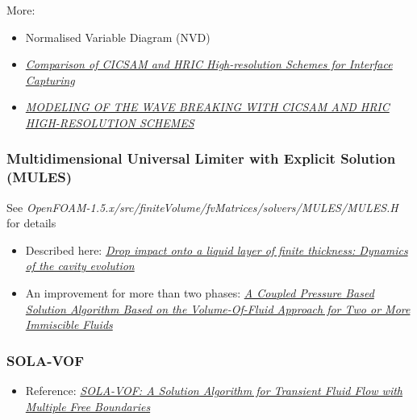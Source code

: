 More:
\begin{itemize}
    \item Normalised Variable Diagram (NVD)
    \item \textit{\href{http://warminski.pollub.plwww.ptmts.org.pl/Waclaw-Koron-2-08.pdf}{Comparison of CICSAM and HRIC High-resolution Schemes for Interface Capturing}}
    \item \textit{\href{http://proceedings.fyper.com/eccomascfd2006/documents/85.pdf}{MODELING OF THE WAVE BREAKING WITH CICSAM AND HRIC HIGH-RESOLUTION SCHEMES}}
\end{itemize}

\subsubsection{Multidimensional Universal Limiter with Explicit Solution (MULES)}

See \textit{OpenFOAM-1.5.x/src/finiteVolume/fvMatrices/solvers/MULES/MULES.H} for details


\begin{itemize}
    \item Described here: \textit{\href{http://link.libris.kb.se/sfxliub?sid=?url_ver=Z39.88-2004&rfr_id=info:sid/bibl.liu.se\%3Axerxes+\%28+PubMed+LiU\%29&rft.genre=article&rft_val_fmt=info\%3Aofi\%2Ffmt\%3Akev\%3Amtx\%3Ajournal&rft.issn=15393755&rft.date=2009&rft.jtitle=Phys+Rev+E+Stat+Nonlin+Soft+Matter+Phys&rft.volume=79&rft.issue=3+Pt+2&rft.spage=036306&rft.atitle=Drop+impact+onto+a+liquid+layer+of+finite+thickness+\%3A+dynamics+of+the+cavity+evolution+&rft.aulast=Berberovi\%C4\%87&rft.aufirst=Edin}{Drop impact onto a liquid layer of finite thickness: Dynamics of the cavity evolution}}
    \item An improvement for more than two phases: \textit{\href{http://www.mathematik.uni-ulm.de/numerik/staff/urban/reports/ECCOMASCFD2010paperfinal.pdf}{A Coupled Pressure Based Solution Algorithm Based on the Volume-Of-Fluid Approach for Two or More Immiscible Fluids}}
\end{itemize}

\subsubsection{SOLA-VOF}

\begin{itemize}
    \item Reference: \textit{\href{http://www.ewp.rpi.edu/hartford/~ernesto/Su2012/CFD/Readings/SOLA-VOF-1980-P1.pdf}{SOLA-VOF: A Solution Algorithm for Transient Fluid Flow with Multiple Free Boundaries}}
\end{itemize}

